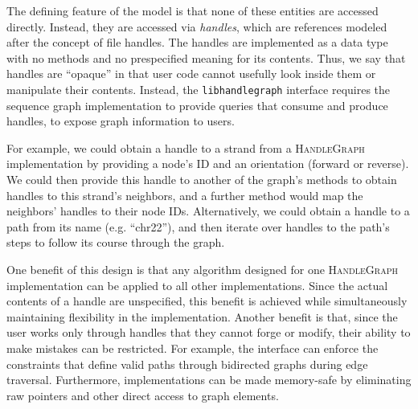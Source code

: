 \documentclass[11pt]{ucthesis}
\begin{document}
The defining feature of the model is that none of these entities are accessed directly.
Instead, they are accessed via \emph{handles}, which are references modeled after the concept of file handles.
The handles are implemented as a data type with no methods and no prespecified meaning for its contents.
Thus, we say that handles are ``opaque'' in that user code cannot usefully look inside them or manipulate their contents.
Instead, the \texttt{libhandlegraph} interface requires the sequence graph implementation to provide queries that consume and produce handles, to expose graph information to users.

For example, we could obtain a handle to a strand from a \textsc{HandleGraph} implementation by providing a node's ID and an orientation (forward or reverse).
We could then provide this handle to another of the graph's methods to obtain handles to this strand's neighbors, and a further method would map the neighbors' handles to their node IDs.
Alternatively, we could obtain a handle to a path from its name (e.g. ``chr22''), and then iterate over handles to the path's steps to follow its course through the graph.

One benefit of this design is that any algorithm designed for one \textsc{HandleGraph} implementation can be applied to all other implementations.
Since the actual contents of a handle are unspecified, this benefit is achieved while simultaneously maintaining flexibility in the implementation.
Another benefit is that, since the user works only through handles that they cannot forge or modify, their ability to make mistakes can be restricted.
For example, the interface can enforce the constraints that define valid paths through bidirected graphs during edge traversal.
Furthermore, implementations can be made memory-safe by eliminating raw pointers and other direct access to graph elements.

 
\end{document}
